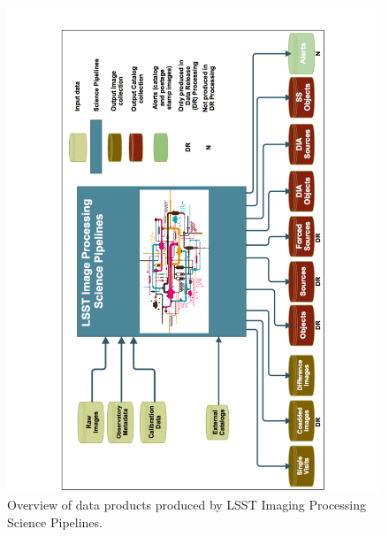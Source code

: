 \documentclass[12pt]{article}
\begin{document}
\begin{figure}[!t]
    \centering
    \vskip -0.7in
    \includegraphics[scale=0.515, angle=270]{gliffy/LSSTimageProcessingDetail0}
    \vskip -0.7in
    \caption{Overview of data products produced by LSST Imaging Processing Science Pipelines.\label{fig:Detail0}}
\end{figure}
\end{document}

